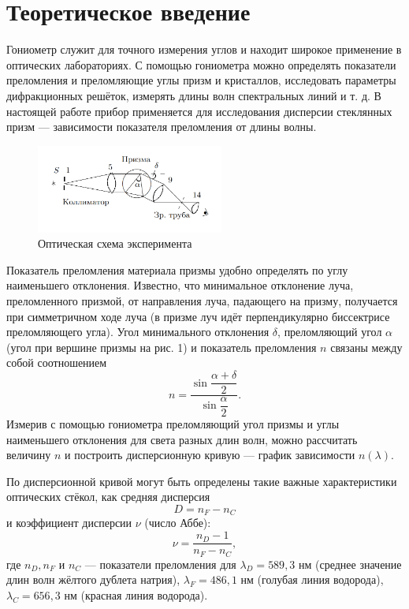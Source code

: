 \documentclass[a4paper,12pt]{article}
\begin{document}
	\section*{Теоретическое введение} 
	Гониометр служит для точного измерения углов и находит широкое применение в оптических лабораториях. С помощью гониометра можно определять показатели преломления и преломляющие углы призм и кристаллов, исследовать параметры дифракционных решёток, измерять длины волн спектральных линий и т. д. В настоящей работе прибор применяется для исследования дисперсии стеклянных призм --- зависимости показателя преломления от длины волны.
	\begin{figure}[h]
		\begin{center}
			\includegraphics[width = 0.55\textwidth]{443-1.png}
			\caption{Оптическая схема эксперимента}
		\end{center}
	\end{figure}
	Показатель преломления материала призмы удобно определять по углу наименьшего отклонения. Известно, что минимальное отклонение луча, преломленного призмой, от направления луча, падающего на призму, получается при симметричном ходе луча (в призме луч идёт перпендикулярно биссектрисе преломляющего угла). Угол минимального отклонения $\delta$, преломляющий угол $\alpha$ (угол при вершине призмы на рис. 1) и показатель преломления $n$ связаны между собой соотношением
	\begin{equation}
	n=\dfrac{\sin\dfrac{\alpha+\delta}{2}}{\sin\dfrac{\alpha}{2}}.
	\end{equation}
	Измерив с помощью гониометра преломляющий угол призмы и углы наименьшего отклонения для света разных длин волн, можно рассчитать величину $n$ и построить дисперсионную кривую --- график зависимости $n(\lambda)$. 
	
	По дисперсионной кривой могут быть определены такие важные характеристики оптических стёкол, как средняя дисперсия
	\begin{equation}
	D = n_F - n_C
	\end{equation}
	и коэффициент дисперсии $\nu$ (число Аббе):
	\begin{equation}
	\nu = \dfrac{n_D - 1}{n_F - n_C},
	\end{equation}
	где $n_D, n_F$ и $n_C$ --- показатели преломления для $\lambda_D = 589{,}3$ нм (среднее значение длин волн жёлтого дублета натрия), $\lambda_F = 486{,}1$ нм (голубая линия водорода), $\lambda_C = 656{,}3$ нм (красная линия водорода).
	
\end{document}
